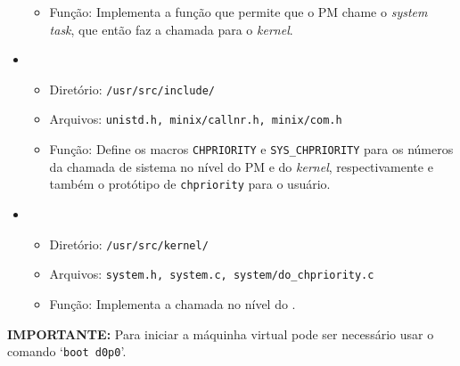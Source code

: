 \documentclass[12pt, a4paper]{article}
\begin{document}
\begin{itemize}
\begin{itemize}
\item Função: Implementa a função que permite que o PM chame o \textit{system task}, que então faz a chamada para o \textit{kernel}.

\end{itemize}

\item \begin{itemize}

\item Diretório: \texttt{/usr/src/include/}

\item Arquivos: \texttt{unistd.h, minix/callnr.h, minix/com.h}

\item Função: Define os macros \texttt{CHPRIORITY} e \texttt{SYS{\_}CHPRIORITY} para os números da chamada de sistema no nível do PM e do \textit{kernel}, respectivamente e também o protótipo de \texttt{chpriority} para o usuário.

\end{itemize}

\item \begin{itemize}

\item Diretório: \texttt{/usr/src/kernel/}

\item Arquivos: \texttt{system.h, system.c, system/do{\_}chpriority.c}

\item Função: Implementa a chamada no nível do .
\end{itemize}

\end{itemize}


\textbf{IMPORTANTE:} Para iniciar a máquinha virtual pode ser necessário usar o comando `\texttt{boot d0p0}'.
\end{document}
